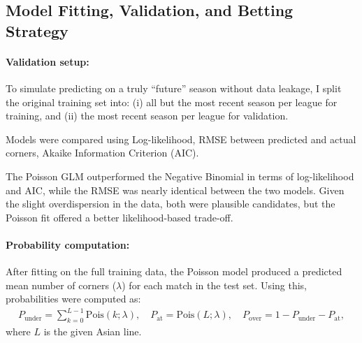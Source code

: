 \documentclass[12pt]{article}
\begin{document}
\subsection*{Model Fitting, Validation, and Betting Strategy}



\paragraph{Validation setup:}  
To simulate predicting on a truly “future” season without data leakage, I 
split the original training set into: (i) all but the most recent season per league for training, and (ii) the most recent season per league for validation.

Models were compared using Log-likelihood, RMSE between predicted and actual corners, Akaike Information Criterion (AIC).

The Poisson GLM outperformed the Negative Binomial in terms of log-likelihood and AIC, while the RMSE was nearly identical between the two models.
Given the slight overdispersion in the data, both were plausible candidates, but the Poisson fit offered a better likelihood-based trade-off.
\paragraph{Probability computation:}  
After fitting on the full training data, the Poisson model produced a predicted mean number of corners ($\lambda$) for each match in the test set.  
Using this, probabilities were computed as:
\begin{align*}
    P_\text{under} = \sum_{k=0}^{L-1} \text{Pois}(k; \lambda), \quad
    P_\text{at} = \text{Pois}(L; \lambda), \quad
    P_\text{over} = 1 - P_\text{under} - P_\text{at},
\end{align*}
where $L$ is the given Asian line.
\end{document}
